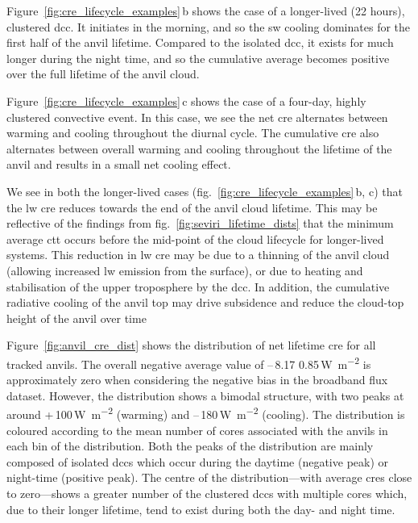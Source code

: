 Figure~\ref{fig:cre_lifecycle_examples}\,b shows the case of a longer-lived (22 hours), clustered \acrshort{dcc}. 
It initiates in the morning, and so the \acrshort{sw} cooling dominates for the first half of the anvil lifetime. 
Compared to the isolated \acrshort{dcc}, it exists for much longer during the night time, and so the cumulative average becomes positive over the full lifetime of the anvil cloud.

Figure~\ref{fig:cre_lifecycle_examples}\,c shows the case of a four-day, highly clustered convective event. 
In this case, we see the net \acrshort{cre} alternates between warming and cooling throughout the diurnal cycle. 
The cumulative \acrshort{cre} also alternates between overall warming and cooling throughout the lifetime of the anvil and results in a small net cooling effect.

We see in both the longer-lived cases (fig.~\ref{fig:cre_lifecycle_examples}\,b, c) that the \acrshort{lw} \acrshort{cre} reduces towards the end of the anvil cloud lifetime. 
This may be reflective of the findings from fig.~\ref{fig:seviri_lifetime_dists} that the minimum average \acrshort{ctt} occurs before the mid-point of the cloud lifecycle for longer-lived systems. 
This reduction in \acrshort{lw} \acrshort{cre} may be due to a thinning of the anvil cloud (allowing increased \acrshort{lw} emission from the surface), or due to heating and stabilisation of the upper troposphere by the \acrshort{dcc}.
In addition, the cumulative radiative cooling of the anvil top may drive subsidence and reduce the cloud-top height of the anvil over time \citep{sokol_tropical_2020}

Figure~\ref{fig:anvil_cre_dist} shows the distribution of net lifetime \acrshort{cre} for all tracked anvils. 
The overall negative average value of --\,8.17\,\textpm\,0.85\,\unit{W m^{-2}} is approximately zero when considering the negative bias in the broadband flux dataset. 
However, the distribution shows a bimodal structure, with two peaks at around +\,100\,\unit{W m^{-2}} (warming) and --\,180\,\unit{W m^{-2}} (cooling). 
The distribution is coloured according to the mean number of cores associated with the anvils in each bin of the distribution. 
Both the peaks of the distribution are mainly composed of isolated \acrshort{dcc}s which occur during the daytime (negative peak) or night-time (positive peak). 
The centre of the distribution---with average \acrshort{cre}s close to zero---shows a greater number of the clustered \acrshort{dcc}s with multiple cores which, due to their longer lifetime, tend to exist during both the day- and night time.


